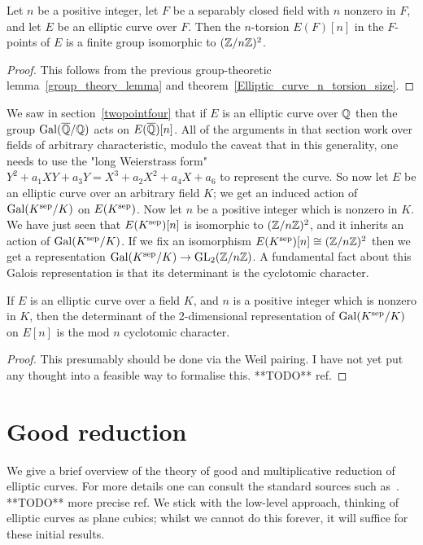 \begin{corollary}\label{Elliptic_curve_n_torsion_2d}
  Let $n$ be a positive integer, let $F$ be a separably closed
  field with $n$ nonzero in $F$, and let $E$ be an elliptic curve over $F$. Then the $n$-torsion $E(F)[n]$ 
  in the $F$-points of $E$ is a finite group isomorphic to $(\mathbb{Z}/n\mathbb{Z})^2$.
\end{corollary}
\begin{proof}
  This follows from the previous group-theoretic lemma~\ref{group_theory_lemma} and
  theorem~\ref{Elliptic_curve_n_torsion_size}.
\end{proof}

We saw in section~\ref{twopointfour} that if $E$ is an elliptic curve over $\mathbb{Q}$ then the group $\operatorname{Gal}(\overline{\mathbb{Q}}/\mathbb{Q})$ acts on $E(\overline{\mathbb{Q}})[n]$. All of the arguments in that section work over fields of arbitrary characteristic, modulo the caveat that in this generality, one needs to use the "long Weierstrass form" $Y^2+a_1XY+a_3Y=X^3+a_2X^2+a_4X+a_6$ to represent the curve. So now let $E$ be an elliptic curve over an arbitrary field $K$; we get an induced action of $\operatorname{Gal}(K^{\operatorname{sep}}/K)$ on $E(K^{\operatorname{sep}})$. Now let $n$ be a positive integer which is nonzero in $K$. We have just seen that $E(K^{\operatorname{sep}})[n]$ is isomorphic to $(\mathbb{Z}/n\mathbb{Z})^2$, and it inherits an action of $\operatorname{Gal}(K^{\operatorname{sep}}/K)$. If we fix an isomorphism $E(K^{\operatorname{sep}})[n]\cong(\mathbb{Z}/n\mathbb{Z})^2$ then we get a representation $\operatorname{Gal}(K^{\operatorname{sep}}/K)\to\operatorname{GL}_2(\mathbb{Z}/n\mathbb{Z})$. A fundamental fact about this Galois representation is that its determinant is the cyclotomic character.

\begin{theorem}\label{Elliptic_curve_det_n_torsion} If $E$ is an elliptic curve over a field $K$, and $n$ is a positive integer which is nonzero in $K$, then the determinant of the 2-dimensional representation of $\operatorname{Gal}(K^{\operatorname{sep}}/K)$ on $E[n]$ is the mod $n$ cyclotomic character.
\end{theorem}
\begin{proof}
  This presumably should be done via the Weil pairing. I have not yet put any thought into a feasible way to formalise this. **TODO** ref.
\end{proof}

\section{Good reduction}

We give a brief overview of the theory of good and multiplicative reduction of elliptic curves.
For more details one can consult the standard sources such as~\cite{silverman1}. **TODO** more
precise ref. We stick with the low-level approach, thinking of elliptic curves as plane cubics; whilst we cannot do this forever, it will suffice for these initial results.

